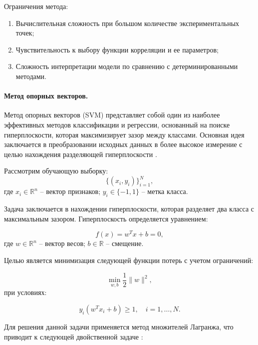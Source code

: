 Ограничения метода:

\begin{enumerate}
    \item Вычислительная сложность при большом количестве экспериментальных точек;
    \item Чувствительность к выбору функции корреляции и ее параметров;
    \item Сложность интерпретации модели по сравнению с детерминированными методами.
\end{enumerate}

\paragraph{Метод опорных векторов.}

Метод опорных векторов (SVM) представляет собой один из наиболее эффективных методов классификации и
регрессии, основанный на поиске гиперплоскости, которая максимизирует зазор между классами.
Основная идея заключается в преобразовании исходных данных в более
высокое измерение с целью нахождения разделяющей гиперплоскости \cite{Jakkula2006}.

Рассмотрим обучающую выборку:
\begin{equation}
    \{(x_i, y_i)\}_{i=1}^N,
\end{equation}
где $x_i \in \mathbb{R}^n$ -- вектор признаков;
$y_i \in \{-1, 1\}$ -- метка класса.

Задача заключается в нахождении гиперплоскости,
которая разделяет два класса с максимальным зазором. Гиперплоскость определяется уравнением:

\begin{equation}
    f(x) = w^T x + b = 0,
\end{equation}
где $w \in \mathbb{R}^n$ -- вектор весов;
$b \in \mathbb{R}$ -- смещение.

Целью является минимизация следующей функции потерь с учетом ограничений:

\begin{equation}
    \min_{w, b} \frac{1}{2} \|w\|^2,
\end{equation}
при условиях:

\begin{equation}
    y_i (w^T x_i + b) \geq 1, \quad i = 1, \ldots, N.
\end{equation}

Для решения данной задачи применяется метод множителей Лагранжа,
что приводит к следующей двойственной задаче \cite{Patle2013}:

